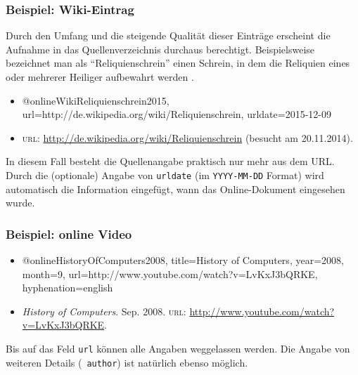 \subsubsection{Beispiel: Wiki-Eintrag}
\label{sec:@online-www}
Durch den Umfang und die steigende Qualität dieser Einträge erscheint
die Aufnahme in das Quellenverzeichnis durchaus berechtigt.
Beispielsweise bezeichnet man als "`Reliquienschrein"'
einen Schrein, in dem die Reliquien eines oder 
mehrerer Heiliger aufbewahrt werden \cite{WikiReliquienschrein2015}.
%
\begin{itemize}
\item[]
\begin{GenericCode}[numbers=none]
@online{WikiReliquienschrein2015,
	url={http://de.wikipedia.org/wiki/Reliquienschrein},
	urldate={2015-12-09}
}
\end{GenericCode}
\item[\cite{WikiReliquienschrein2015}]
\textsc{url}: \url{http://de.wikipedia.org/wiki/Reliquienschrein}
(besucht am 20.11.{\hskip0pt}2014).
\end{itemize}
%
In diesem Fall besteht die Quellenangabe praktisch nur mehr aus dem URL.
Durch die (optionale) Angabe von \texttt{urldate} (im \texttt{YYYY-MM-DD} Format) wird automatisch die Information eingefügt, wann das Online-Dokument eingesehen wurde.


\subsubsection{Beispiel: online Video} 
\label{sec:@online-video}
%
\begin{itemize}
\item[]
\begin{GenericCode}[numbers=none]
@online{HistoryOfComputers2008,
    title={History of Computers},
    year={2008},
		month={9},
    url={http://www.youtube.com/watch?v=LvKxJ3bQRKE},
    hyphenation={english}
}
\end{GenericCode}
\item[\cite{HistoryOfComputers2008}]
\textit{History of Computers}. Sep. 2008. 
\textsc{url}: \url{http://www.youtube.com/watch?v=LvKxJ3bQRKE}.
\end{itemize}
%
Bis auf das Feld \texttt{url} können alle Angaben weggelassen werden. Die Angabe von 
weiteren Details (\zB\ \texttt{author}) ist natürlich ebenso möglich.

